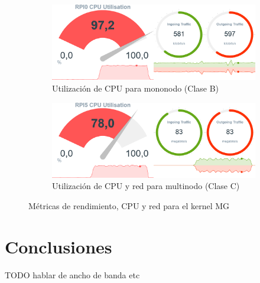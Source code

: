 \begin{figure}[h!]
    \begin{subfigure}[c]{0.75\textwidth}
        \includegraphics[width=\textwidth]{img/benchmark_rev/mg_rev_sn.png}
        \caption{Utilización de CPU para mononodo (Clase B)}
        \label{fig:mops_rev_sn__mg}
    \end{subfigure}

    \vspace{0.5cm}
    
    \begin{subfigure}[c]{0.75\textwidth}
        \includegraphics[width=\textwidth]{img/benchmark_rev/mg_rev_mn.png}
        \caption{Utilización de CPU y red para multinodo (Clase C)}
        \label{fig:mops_rev_mn__mg}
    \end{subfigure}
    \caption{Métricas de rendimiento, CPU y red para el kernel MG}
    \label{fig:mops__mg}
\end{figure}

\section{Conclusiones}
\label{sec:conclusiones_medida_rendimiento}
TODO hablar de ancho de banda etc